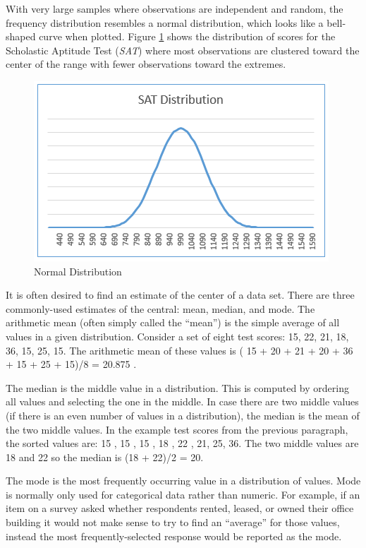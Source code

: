 With very large samples where observations are independent and random, the frequency distribution resembles a normal distribution, which looks like a bell-shaped curve when plotted. Figure \ref{14:fig02} shows the distribution of scores for the Scholastic Aptitude Test (\textit{SAT}) where most observations are clustered toward the center of the range with fewer observations toward the extremes. 

\begin{figure}[H]
	\centering
	\includegraphics[width=\maxwidth{.95\linewidth}]{gfx/14-NormDist}
	\caption{Normal Distribution}
	\label{14:fig02}
\end{figure}

It is often desired to find an estimate of the center of a data set. There are three commonly-used estimates of the central: mean, median, and mode. The arithmetic mean (often simply called the ``mean'') is the simple average of all values in a given distribution. Consider a set of eight test scores: 15, 22, 21, 18, 36, 15, 25, 15. The arithmetic mean of these values is ( 15 + 20 + 21 + 20 + 36 + 15 + 25 + 15)/8 = 20.875 .

The median is the middle value in a distribution. This is computed by ordering all values and selecting the one in the middle. In case there are two middle values (if there is an even number of values in a distribution), the median is the mean of the two middle values. In the example test scores from the previous paragraph, the sorted values are: 15 , 15 , 15 , 18 , 22 , 21, 25, 36. The two middle values are 18 and 22 so the median is (18 + 22)/2 = 20. 

The mode is the most frequently occurring value in a distribution of values. Mode is normally only used for categorical data rather than numeric. For example, if an item on a survey asked whether respondents rented, leased, or owned their office building it would not make sense to try to find an ``average'' for those values, instead the most frequently-selected response would be reported as the mode. 

